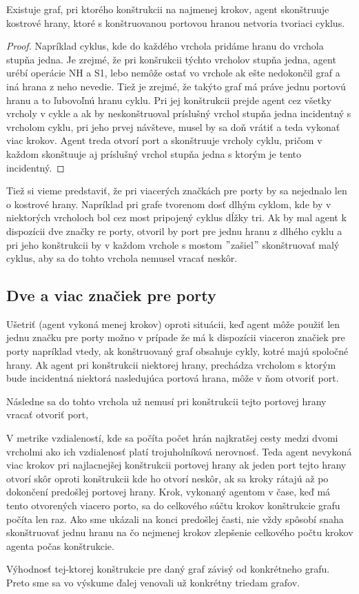 \begin{lem}
Existuje graf, pri ktorého konštrukcii na najmenej krokov, agent
skonštruuje kostrové hrany, ktoré s konštruovanou portovou hranou netvoria
tvoriaci cyklus.
\end{lem}
\begin{proof}
Napríklad cyklus, kde do každého vrchola pridáme hranu do vrchola stupňa
jedna. Je zrejmé, že pri konšrukcii týchto vrcholov stupňa jedna, agent
urébí operácie NH a S1, lebo nemôže ostať vo vrchole ak ešte nedokončil graf
a iná hrana z neho nevedie. Tiež je zrejmé, že takýto graf má práve jednu
portovú hranu a to ľubovoľnú hranu cyklu. Pri jej konštrukcii prejde agent
cez všetky vrcholy v cykle a ak by neskonštruoval príslušný vrchol stupňa
jedna incidentný s vrcholom cyklu, pri jeho prvej návšteve, musel by sa doň
vrátiť a teda vykonať viac krokov. Agent treda otvorí port a skonštruuje
vrcholy cyklu, pričom v každom skonštuuje aj príslušný vrchol stupňa jedna s
ktorým je tento incidentný.
\end{proof}

Tiež si vieme predstaviť, že pri viacerých značkách pre porty
 by sa nejednalo len o kostrové hrany. Napríklad
pri grafe tvorenom dosť dlhým cyklom, kde by v niektorých vrcholoch bol cez
most pripojený cyklus dĺžky tri. Ak by mal agent k dispozícii dve značky re
porty, otvoril by port pre jednu hranu z dlhého cyklu a pri jeho konštrukcii
by v každom vrchole s mostom $"$zašiel$"$ skonštruovať malý cyklus, aby sa
do tohto vrchola nemusel vracať neskôr.

\subsection{Dve a viac značiek pre porty}
Ušetriť (agent vykoná menej krokov) oproti situácii, 
keď agent môže použiť len jednu značku pre porty
možno v prípade že má k dispozícii viaceron značiek pre porty napríklad vtedy,
 ak konštruovaný graf obsahuje cykly, kotré majú spoločné hrany.
Ak agent pri konštrukcii niektorej hrany, 
prechádza vrcholom s ktorým bude incidentná niektorá nasledujúca
portová
hrana, môže v ňom otvoriť port. 

Následne sa do tohto vrchola už nemusí pri konštrukcii
tejto portovej hrany vracať otvoriť port, 

V metrike
vzdialeností, kde sa počíta počet hrán najkratšej cesty medzi dvomi vrcholmi
ako ich vzdialenosť platí trojuholníková nerovnosť. Teda agent
nevykoná viac krokov pri najlacnejšej 
konštrukcii portovej hrany ak jeden port tejto hrany otvorí skôr oproti
konštrukcii kde ho otvorí neskôr, ak sa kroky rátajú až po dokončení
predošlej portovej hrany. Krok, vykonaný agentom v čase, keď má tento
otvorených viacero porto, sa do celkového súčtu krokov konštrukcie grafu 
počíta len raz.
Ako sme ukázali na konci predošlej časti, nie vždy spôsobí snaha skonštruovať 
jednu hranu na čo
nejmenej krokov zlepšenie celkového počtu krokov agenta počas konštrukcie.

Výhodnosť tej-ktorej konštrukcie pre daný graf závisý od konkrétneho grafu.
Preto sme sa vo výskume ďalej venovali už konkrétny triedam grafov.